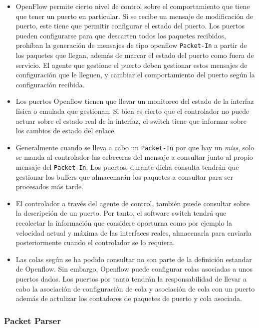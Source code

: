 \begin{itemize}
    \item OpenFlow permite cierto nivel de control sobre el comportamiento que tiene que tener un puerto en particular. Si se recibe un mensaje de modificación de puerto, este tiene que permitir configurar el estado del puerto. Los puertos pueden configurarse para que descarten todos los paquetes recibidos, prohíban la generación de mensajes de tipo openflow \texttt{Packet-In} a partir de los paquetes que llegan, además de marcar el estado del puerto como fuera de servicio. El agente que gestione el puerto deben gestionar estos mensajes de configuración que le lleguen, y cambiar el comportamiento del puerto según la configuración recibida.

    \item Los puertos Openflow tienen que llevar un monitoreo del estado de la interfaz física o emulada que gestionan. Si bien es cierto que el controlador no puede actuar sobre el estado real de la interfaz, el switch tiene que informar sobre los cambios de estado del enlace.

    \item  Generalmente cuando se lleva a cabo un \texttt{Packet-In} por que hay un \textit{miss}, solo se manda al controlador las cebeceras del mensaje a consultar junto al propio mensaje del \texttt{Packet-In}. Los puertos, durante dicha consulta tendrán que gestionar los buffers que almacenarán los paquetes a consultar para ser procesados más tarde.

    \item El controlador a través del agente de control, también puede consultar sobre la descripción de un puerto. Por tanto, el software switch tendrá que recolectar la información que considere oporturna como por ejemplo la velocidad actual y máxima de las interfaces reales, almacenarla para enviarla posteriormente cuando el controlador se lo requiera.

    \item Las colas según se ha podido consultar no son parte de la definición estandar de Openflow. Sin embargo, Openflow puede  configurar colas asociadas a unos puertos dados. Los puertos por tanto tendrán la responsabilidad de llevar a cabo la asociación de configuración de cola y asociación de cola con un puerto además de actulizar los contadores de paquetes de puerto y cola asociada.
\end{itemize}

\subsubsection{Packet Parser}

